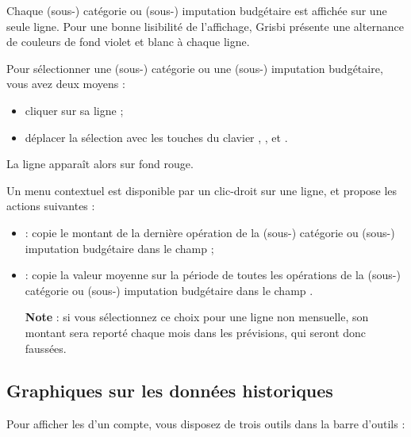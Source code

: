 
Chaque (sous-) catégorie ou (sous-) imputation budgétaire est affichée sur une seule ligne. Pour une bonne lisibilité de l'affichage, Grisbi présente une alternance de couleurs de fond violet et blanc{\couleurs} à chaque ligne.

Pour sélectionner une (sous-) catégorie ou une (sous-) imputation budgétaire, vous avez deux moyens :
\begin{itemize}
	 \item cliquer sur sa ligne ;
	 \item déplacer la sélection avec les touches du clavier , , et .
\end{itemize}
La ligne apparaît alors sur fond rouge{\couleur}.

Un menu contextuel est disponible par un clic-droit sur une ligne, et propose les actions suivantes :
\begin{itemize}
	\item {} : copie  le montant de la dernière opération de la (sous-) catégorie ou (sous-) imputation budgétaire dans le champ  ;
	\item {} : copie la valeur moyenne sur la période de toutes les opérations de la (sous-) catégorie ou (sous-) imputation budgétaire dans le champ .

	\textbf{Note} : si vous sélectionnez ce choix pour une ligne non mensuelle, son montant sera reporté chaque mois dans les prévisions, qui seront donc faussées.
\end{itemize}


\subsection{Graphiques sur les données historiques\label{budget-data-chart}}

Pour afficher les  d'un compte, vous disposez de trois outils dans la barre d'outils : 

